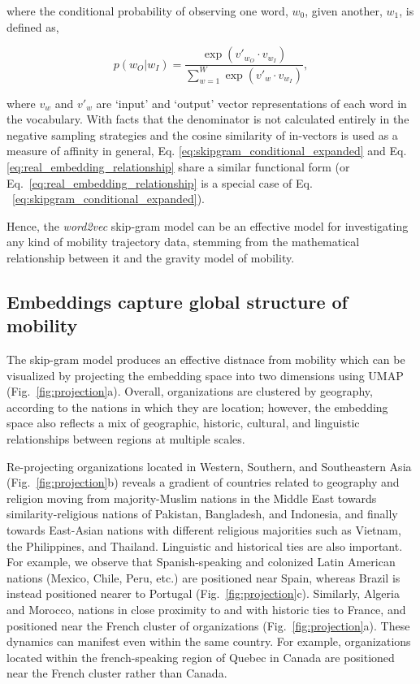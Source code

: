 \documentclass[12pt]{article} %
\begin{document}
where the conditional probability of observing one word, $w_{0}$, given another, $w_{1}$, is defined as,

\begin{equation}
    \label{eq:skipgram_conditional_expanded}
    p(w_O|w_I) = \frac{\exp(v'_{w_O} \cdot v_{w_I})}{\sum_{w=1}^{W} \exp(v'_w \cdot v_{w_I})}, 
\end{equation}

where $v_w$ and $v'_w$ are `input' and `output' vector representations of each word in the vocabulary. With facts that the denominator is not calculated entirely in the negative sampling strategies and the cosine similarity of in-vectors is used as a measure of affinity in general, Eq. \ref{eq:skipgram_conditional_expanded} and Eq. \ref{eq:real_embedding_relationship} share a similar functional form (or Eq.~\ref{eq:real_embedding_relationship} is a special case of Eq. ~\ref{eq:skipgram_conditional_expanded}).

Hence, the \textit{word2vec} skip-gram model can be an effective model for investigating any kind of mobility trajectory data, stemming from the mathematical relationship between it and the gravity model of mobility. 


%
%
\subsection*{Embeddings capture global structure of mobility}

The skip-gram model produces an effective distnace from mobility which can be visualized by projecting the embedding space into two dimensions using UMAP~\autocite{mcinnes2018umap} (Fig.~\ref{fig:projection}a).
Overall, organizations are clustered by geography, according to the nations in which they are location;
however, the embedding space also reflects a mix of geographic, historic, cultural, and linguistic relationships between regions at multiple scales.

Re-projecting organizations located in Western, Southern, and Southeastern Asia (Fig.~\ref{fig:projection}b) reveals a gradient of countries related to geography and religion moving from majority-Muslim nations in the Middle East towards similarity-religious nations of Pakistan, Bangladesh, and Indonesia, and finally towards East-Asian nations with different religious majorities such as Vietnam, the Philippines, and Thailand. 
Linguistic and historical ties are also important. 
For example, we observe that Spanish-speaking and colonized Latin American nations (Mexico, Chile, Peru, etc.) are positioned near Spain, whereas Brazil is instead positioned nearer to Portugal (Fig.~\ref{fig:projection}c). 
Similarly, Algeria and Morocco, nations in close proximity to and with historic ties to France, and positioned near the French cluster of organizations (Fig.~\ref{fig:projection}a). 
These dynamics can manifest even within the same country. 
For example, organizations located within the french-speaking region of Quebec in Canada are positioned near the French cluster rather than Canada.
\end{document}
